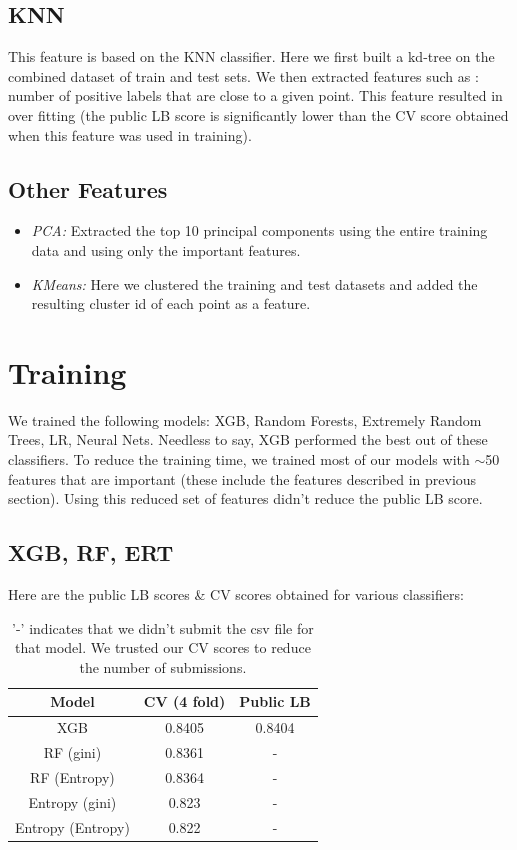\documentclass{article}
\begin{document}
\subsection{KNN}
This feature is based on the KNN classifier. Here we first built a kd-tree on the combined dataset of train and test sets. We then
extracted features such as : number of positive labels that are close to a given point. This feature resulted in over fitting (the public LB score is significantly lower than the CV score obtained when this feature was used in training).
\subsection{Other Features}
\begin{itemize}
\item \textit{PCA:} Extracted the top 10 principal components using the entire training data and using only the important features.
\item \textit{KMeans:} Here we clustered the training and test datasets and added the resulting cluster id of each point as a feature.
\end{itemize}
\section{Training}
We trained the following models: XGB, Random Forests, Extremely Random Trees, LR, Neural Nets. Needless to say, XGB performed the best out of these classifiers. To reduce the training time, we trained most of our models with $\sim$50 features that are important (these include the features described in previous section). Using this reduced set of features didn't reduce the public LB score.
\subsection{XGB, RF, ERT}
Here are the public LB scores \& CV scores obtained for various classifiers:
\begin{table}[h!]
\begin{center}
\begin{tabular}{ |c|c|c| } 
\hline
Model&CV (4 fold)& Public LB\\ \hline
XGB&0.8405&0.8404\\ \hline
RF (gini)&0.8361&-\\ \hline
RF (Entropy)&0.8364&-\\ \hline
Entropy (gini)&0.823&-\\ \hline
Entropy (Entropy)&0.822&-\\ \hline
\end{tabular}
\end{center}
\caption{'-' indicates that we didn't submit the csv file for that model. We trusted our CV scores to reduce the number of submissions.}
\end{table}
\end{document}
